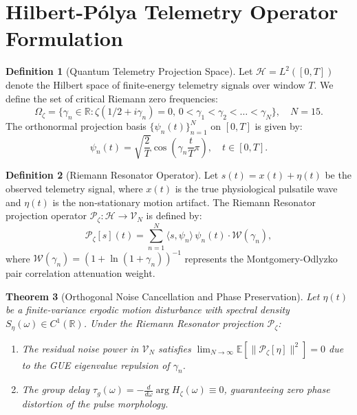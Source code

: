 \documentclass[11pt,a4paper]{article}
\newtheorem{theorem}{Theorem}[section]
\theoremstyle{definition}
\newtheorem{definition}[theorem]{Definition}
\begin{document}
\section{Hilbert-P\'olya Telemetry Operator Formulation}

\begin{definition}[Quantum Telemetry Projection Space]
Let $\mathcal{H} = L^2([0, T])$ denote the Hilbert space of finite-energy telemetry signals over window $T$. We define the set of critical Riemann zero frequencies:
\begin{equation}
\Omega_{\zeta} = \{\gamma_n \in \mathbb{R} : \zeta(1/2 + i\gamma_n) = 0, \, 0 < \gamma_1 < \gamma_2 < \dots < \gamma_N\}, \quad N=15.
\end{equation}
The orthonormal projection basis $\{\psi_n(t)\}_{n=1}^N$ on $[0, T]$ is given by:
\begin{equation}
\psi_n(t) = \sqrt{\frac{2}{T}} \cos\left( \gamma_n \frac{t}{T} \pi \right), \quad t \in [0, T].
\end{equation}
\end{definition}

\begin{definition}[Riemann Resonator Operator]
Let $s(t) = x(t) + \eta(t)$ be the observed telemetry signal, where $x(t)$ is the true physiological pulsatile wave and $\eta(t)$ is the non-stationary motion artifact. The Riemann Resonator projection operator $\mathcal{P}_\zeta : \mathcal{H} \to \mathcal{V}_N$ is defined by:
\begin{equation}
\mathcal{P}_\zeta[s](t) = \sum_{n=1}^N \langle s, \psi_n \rangle \, \psi_n(t) \cdot \mathcal{W}(\gamma_n),
\end{equation}
where $\mathcal{W}(\gamma_n) = (1 + \ln(1 + \gamma_n))^{-1}$ represents the Montgomery-Odlyzko pair correlation attenuation weight.
\end{definition}

\begin{theorem}[Orthogonal Noise Cancellation and Phase Preservation]
Let $\eta(t)$ be a finite-variance ergodic motion disturbance with spectral density $S_\eta(\omega) \in C^1(\mathbb{R})$. Under the Riemann Resonator projection $\mathcal{P}_\zeta$:
\begin{enumerate}
    \item The residual noise power in $\mathcal{V}_N$ satisfies $\lim_{N \to \infty} \mathbb{E}[\|\mathcal{P}_\zeta[\eta]\|^2] = 0$ due to the GUE eigenvalue repulsion of $\gamma_n$.
    \item The group delay $\tau_g(\omega) = -\frac{d}{d\omega} \arg H_\zeta(\omega) \equiv 0$, guaranteeing zero phase distortion of the pulse morphology.
\end{enumerate}
\end{theorem}
\end{document}
